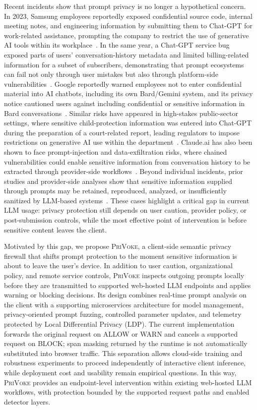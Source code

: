 \documentclass[conference]{IEEEtran}
\newcommand{\privoke}{\textsc{PriVoke}\xspace}
\begin{document}
Recent incidents show that prompt privacy is no longer a hypothetical concern. In 2023, Samsung employees reportedly exposed confidential source code, internal meeting notes, and engineering information by submitting them to Chat-GPT for work-related assistance, prompting the company to restrict the use of generative AI tools within its workplace~\cite{SamsungBans2023}. In the same year, a Chat-GPT service bug exposed parts of users' conversation-history metadata and limited billing-related information for a subset of subscribers, demonstrating that prompt ecosystems can fail not only through user mistakes but also through platform-side vulnerabilities~\cite{BBCChatGPTHistoryBug2023}. Google reportedly warned employees not to enter confidential material into AI chatbots, including its own Bard/Gemini system, and its privacy notice cautioned users against including confidential or sensitive information in Bard conversations~\cite{GoogleWarns2023}. Similar risks have appeared in high-stakes public-sector settings, where sensitive child-protection information was entered into Chat-GPT during the preparation of a court-related report, leading regulators to impose restrictions on generative AI use within the department~\cite{ChatGPTChildProtection}. Claude.ai has also been shown to face prompt-injection and data-exfiltration risks, where chained vulnerabilities could enable sensitive information from conversation history to be extracted through provider-side workflows~\cite{ClaudeDay2026}. Beyond individual incidents, prior studies and provider-side analyses show that sensitive information supplied through prompts may be retained, reproduced, analyzed, or insufficiently sanitized by LLM-based systems~\cite{tamkin2024clio,priyanshu2023chatbots}. These cases highlight a critical gap in current LLM usage: privacy protection still depends on user caution, provider policy, or post-submission controls, while the most effective point of intervention is before sensitive content leaves the client.

Motivated by this gap, we propose \privoke, a client-side semantic privacy firewall that shifts prompt protection to the moment sensitive information is about to leave the user's device. In addition to user caution, organizational policy, and remote service controls, \privoke inspects outgoing prompts locally before they are transmitted to supported web-hosted LLM endpoints and applies warning or blocking decisions. Its design combines real-time prompt analysis on the client with a supporting microservices architecture for model management, privacy-oriented prompt fuzzing, controlled parameter updates, and telemetry protected by Local Differential Privacy (LDP). The current implementation forwards the original request on ALLOW or WARN and cancels a supported request on BLOCK; span masking returned by the runtime is not automatically substituted into browser traffic. This separation allows cloud-side training and robustness experiments to proceed independently of interactive client inference, while deployment cost and usability remain empirical questions. In this way, \privoke provides an endpoint-level intervention within existing web-hosted LLM workflows, with protection bounded by the supported request paths and enabled detector layers.
\end{document}
